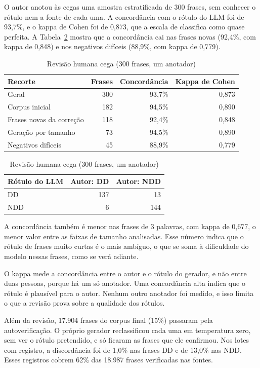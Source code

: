 \documentclass[
    12pt,                %
    openright,           %
    oneside,             %
    a4paper,             %
    english,             %
    brazil               %
]{abntex2}
\begin{document}
O autor anotou às cegas uma amostra estratificada de 300 frases, sem conhecer o rótulo nem a fonte de cada uma. A concordância com o rótulo do LLM foi de 93,7\%, e o kappa de Cohen \cite{Cohen1960} foi de 0,873, que a escala de  classifica como quase perfeita. A Tabela~\ref{tab:anotacao} mostra que a concordância cai nas frases novas (92,4\%, com kappa de 0,848) e nos negativos difíceis (88,9\%, com kappa de 0,779).

\begin{table}[htb]
\centering
\caption{Revisão humana cega (300 frases, um anotador)}
\label{tab:anotacao}
\small
\begin{tabular}{lrrr}
\toprule
Recorte & Frases & Concordância & Kappa de Cohen \\
\midrule
Geral & 300 & 93,7\% & 0,873 \\
Corpus inicial & 182 & 94,5\% & 0,890 \\
Frases novas da correção & 118 & 92,4\% & 0,848 \\
Geração por tamanho & 73 & 94,5\% & 0,890 \\
Negativos difíceis & 45 & 88,9\% & 0,779 \\
\bottomrule
\end{tabular}
\par\vspace{8pt}
\begin{tabular}{lrr}
\toprule
Rótulo do LLM & Autor: DD & Autor: NDD \\
\midrule
DD & 137 & 13 \\
NDD & 6 & 144 \\
\bottomrule
\end{tabular}
\end{table}

A concordância também é menor nas frases de 3 palavras, com kappa de 0,677, o menor valor entre as faixas de tamanho analisadas. Esse número indica que o rótulo de frases muito curtas é o mais ambíguo, o que se soma à dificuldade do modelo nessas frases, como se verá adiante.

O kappa mede a concordância entre o autor e o rótulo do gerador, e não entre duas pessoas, porque há um só anotador. Uma concordância alta indica que o rótulo é plausível para o autor. Nenhum outro anotador foi medido, e isso limita o que a revisão prova sobre a qualidade dos rótulos.

Além da revisão, 17.904 frases do corpus final (15\%) passaram pela autoverificação. O próprio gerador reclassificou cada uma em temperatura zero, sem ver o rótulo pretendido, e só ficaram as frases que ele confirmou. Nos lotes com registro, a discordância foi de 1,0\% nas frases DD e de 13,0\% nas NDD. Esses registros cobrem 62\% das 18.987 frases verificadas nas fontes.
\end{document}
